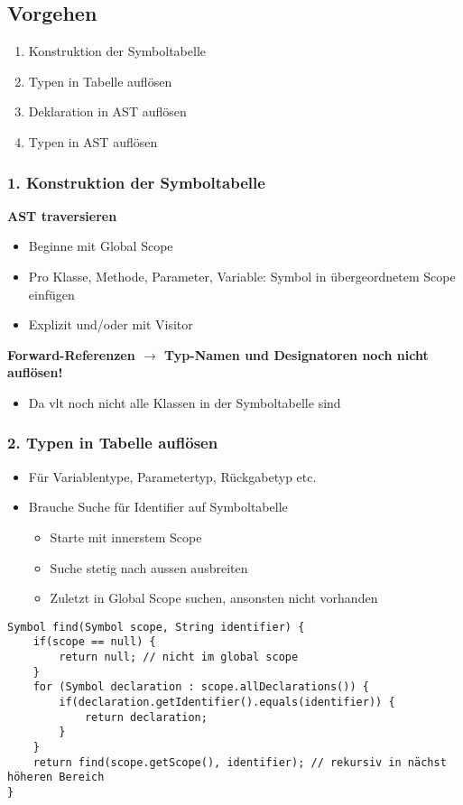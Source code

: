 \subsection{Vorgehen}
\begin{enumerate}
    \item Konstruktion der Symboltabelle
    \item Typen in Tabelle auflösen 
    \item Deklaration in AST auflösen 
    \item Typen in AST auflösen
\end{enumerate}

\subsubsection{1. Konstruktion der Symboltabelle}
\textbf{AST traversieren}
\begin{itemize}
    \item Beginne mit Global Scope
    \item Pro Klasse, Methode, Parameter, Variable: Symbol in übergeordnetem Scope einfügen
    \item Explizit und/oder mit Visitor
\end{itemize}
\textbf{Forward-Referenzen $\rightarrow$ Typ-Namen und Designatoren noch nicht auflösen!}
\begin{itemize}
    \item Da vlt noch nicht alle Klassen in der Symboltabelle sind
\end{itemize}

\subsubsection{2. Typen in Tabelle auflösen}
\begin{itemize}
    \item Für Variablentype, Parametertyp, Rückgabetyp etc.
    \item Brauche Suche für Identifier auf Symboltabelle
    \begin{itemize}
        \item Starte mit innerstem Scope
        \item Suche stetig nach aussen ausbreiten
        \item Zuletzt in Global Scope suchen, ansonsten nicht vorhanden
    \end{itemize}
\end{itemize}
\begin{lstlisting}
Symbol find(Symbol scope, String identifier) {
    if(scope == null) {
        return null; // nicht im global scope
    }
    for (Symbol declaration : scope.allDeclarations()) {
        if(declaration.getIdentifier().equals(identifier)) {
            return declaration;
        }
    }
    return find(scope.getScope(), identifier); // rekursiv in nächst höheren Bereich
}
\end{lstlisting}

